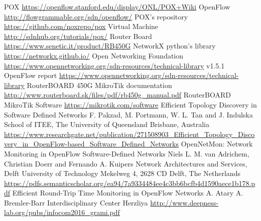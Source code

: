 \documentclass[conference,10pt]{IEEEtran}
\begin{document}
\begin{thebibliography}{99}
	 POX \url{https://openflow.stanford.edu/display/ONL/POX+Wiki}
	 OpenFlow \url{http://flowgrammable.org/sdn/openflow/}
	 POX's repository \url{https://github.com/noxrepo/pox}
	 Virtual Machine \url{http://sdnhub.org/tutorials/pox/}
	 Router Board \url{https://www.senetic.it/product/RB450G}
	 NetworkX python's library \url{https://networkx.github.io/}
	 Open Networking Foundation \url{https://www.opennetworking.org/sdn-resources/technical-library}
	 v1.5.1 OpenFlow report \url{https://www.opennetworking.org/sdn-resources/technical-library}
	 RouterBOARD 450G MikroTik documentation \url{http://www.routerboard.sk/files/pdf/rb450g_manual.pdf}
	 RouterBOARD MikroTik Software \url{https://mikrotik.com/software}
	  Efficient Topology Discovery in Software Defined Networks F. Pakzad, M. Portmann, W. L. Tan and J. Indulska 
	School of ITEE, The University of Queensland Brisbane, Australia \url{https://www.researchgate.net/publication/271508903_Efficient_Topology_Discovery_in_OpenFlow-based_Software_Defined_Networks}
	 OpenNetMon: Network Monitoring in OpenFlow Software-Defined Networks Niels L.
	M. van Adrichem, Christian Doerr and Fernando A. Kuipers Network Architectures and Services, Delft University of Technology 
	Mekelweg 4, 2628 CD Delft, The Netherlands \url{https://pdfs.semanticscholar.org/ea94/7a9334484ee4c3bb6bcfb4d1590aece1b178.pdf}
	 Efficient Round-Trip Time Monitoring in OpenFlow Networks A. Atary A. Bremler-Barr Interdisciplinary Center Herzliya \url{http://www.deepness-lab.org/pubs/infocom2016_grami.pdf}
	 
	
	\end{thebibliography}
\end{document}
